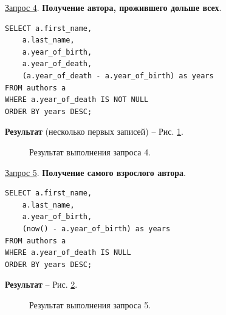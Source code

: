 \documentclass[a4paper,12pt]{article}
\begin{document}
\underline{Запрос 4}. \textbf{Получение автора, прожившего дольше всех}.
\begin{lstlisting}
SELECT a.first_name,
    a.last_name,
    a.year_of_birth,
    a.year_of_death,
    (a.year_of_death - a.year_of_birth) as years
FROM authors a
WHERE a.year_of_death IS NOT NULL
ORDER BY years DESC;
    \end{lstlisting}

\textbf{Результат} (несколько первых записей) -- Рис. \ref{fig:request4}.

\begin{figure}[ht]
    \caption{Результат выполнения запроса 4.}
    \label{fig:request4}
\end{figure}

\underline{Запрос 5}. \textbf{Получение самого взрослого автора}.
\begin{lstlisting}
SELECT a.first_name,
    a.last_name,
    a.year_of_birth,
    (now() - a.year_of_birth) as years
FROM authors a
WHERE a.year_of_death IS NULL
ORDER BY years DESC;
    \end{lstlisting}

\textbf{Результат} -- Рис. \ref{fig:request5}.

\begin{figure}[ht]
    \caption{Результат выполнения запроса 5.}
    \label{fig:request5}
\end{figure}
\end{document}
